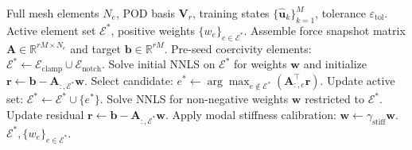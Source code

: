 \begin{algorithm}[htbp]
\caption{Offline ECSW Hyper-reduction Training}
\label{alg:ecsw_training}
\begin{algorithmic}[1]
\Require Full mesh elements $N_e$, POD basis $\bm{V}_r$, training states $\{\hat{\bm{u}}_k\}_{k=1}^{M}$, tolerance $\varepsilon_{\text{tol}}$.
\Ensure Active element set $\mathcal{E}^*$, positive weights $\{w_e\}_{e \in \mathcal{E}^*}$.
\State Assemble force snapshot matrix $\bm{A} \in \mathbb{R}^{rM \times N_e}$ and target $\bm{b} \in \mathbb{R}^{rM}$.
\State Pre-seed coercivity elements: $\mathcal{E}^* \gets \mathcal{E}_{\text{clamp}} \cup \mathcal{E}_{\text{notch}}$.
\State Solve initial NNLS on $\mathcal{E}^*$ for weights $\bm{w}$ and initialize $\bm{r} \gets \bm{b} - \bm{A}_{:, \mathcal{E}^*} \bm{w}$.
    \State Select candidate: $e^* \gets \arg\max_{e \notin \mathcal{E}^*} \left( \bm{A}_{:, e}^\top \bm{r} \right)$.
    \State Update active set: $\mathcal{E}^* \gets \mathcal{E}^* \cup \{e^*\}$.
    \State Solve NNLS for non-negative weights $\bm{w}$ restricted to $\mathcal{E}^*$.
    \State Update residual $\bm{r} \gets \bm{b} - \bm{A}_{:, \mathcal{E}^*} \bm{w}$.
\EndWhile
\State Apply modal stiffness calibration: $\bm{w} \gets \gamma_{\text{stiff}} \bm{w}$.
\State \Return $\mathcal{E}^*, \{w_e\}_{e \in \mathcal{E}^*}$.
\end{algorithmic}
\end{algorithm}


